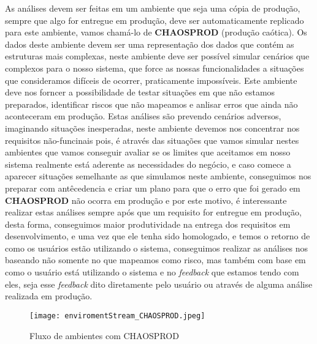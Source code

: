       As análises devem ser feitas em um ambiente que seja uma cópia de produção,
      sempre que algo for entregue em produção, deve ser automaticamente replicado
      para este ambiente, vamos chamá-lo de \textbf{CHAOSPROD} (produção caótica).
      Os dados deste ambiente devem ser uma representação dos dados que contém
      as estruturas mais complexas, neste ambiente deve ser possível simular
      cenários que complexos para o nosso sistema, que force as nossas funcionalidades
      a situações que consideramos difíceis de ocorrer, praticamente impossíveis.
      Este ambiente deve nos forncer a possibilidade de testar situações em que
      não estamos preparados, identificar riscos que não mapeamos e anlisar erros
      que ainda não aconteceram em produção. \newline
      Estas análises são prevendo cenários adversos, imaginando situações inesperadas,
      neste ambiente devemos nos concentrar nos requisitos não-funcinais pois,
      é através das situações que vamos simular nestes ambientes que vamos conseguir
      avaliar se os limites que aceitamos em nosso sistema realmente está aderente
      as necessidades do negócio, e caso comece a aparecer situações semelhante
      as que simulamos neste ambiente, conseguimos nos preparar com antêcedencia
      e criar um plano para que o erro que foi gerado em \textbf{CHAOSPROD} não
      ocorra em produção e por este motivo, é interessante realizar estas análises
      sempre após que um requisito for entregue em produção, desta forma, conseguimos
      maior produtividade na entrega dos requisitos em desenvolvimento, e uma vez
      que ele tenha sido homologado, e temos o retorno de como os usuários estão
      utilizando o sistema, conseguimos realizar as análises nos baseando não somente
      no que mapeamos como risco, mas também com base em como o usuário está
      utilizando o sistema e no \textit{feedback} que estamos tendo com eles,
      seja esse \textit{feedback} dito diretamente pelo usuário ou através de
      alguma análise realizada em produção.

      \begin{figure}[!h]
        \centering
        \texttt{[image: enviromentStream\_CHAOSPROD.jpeg]}
        \caption{Fluxo de ambientes com CHAOSPROD}
        \label{Imagem:3}
      \end{figure}


